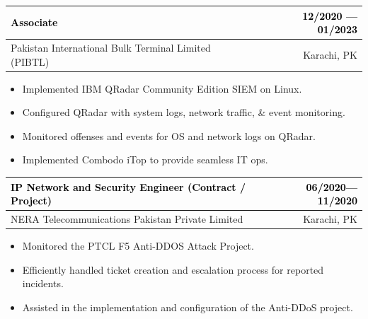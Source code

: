 \documentclass{resume}
\begin{document}
\begin{tabularx}{\linewidth}{|X|r|}
    \hline
    
    \cellcolor{lightblue}\textcolor{black}{Associate} & 
    \cellcolor{lightblue}\textcolor{black}{12/2020 --- 01/2023} \\
    \hline
    
    Pakistan International Bulk Terminal Limited (PIBTL) & Karachi, PK \\
    \hline
\end{tabularx}
\begin{itemize}
\item {} Implemented IBM QRadar Community Edition SIEM on Linux.
\item {} Configured QRadar with system logs, network traffic, \& event monitoring.
\item {} Monitored offenses and events for OS and network logs on QRadar.
\item {} Implemented Combodo iTop to provide seamless IT ops.
\end{itemize}
 \vspace{-0.2cm} 
\divider

  
\begin{tabularx}{\linewidth}{|X|r|}
    \hline
    
    \cellcolor{lightblue}\textcolor{black}{IP Network and Security Engineer (Contract / Project)} & 
    \cellcolor{lightblue}\textcolor{black}{06/2020--- 11/2020} \\
    \hline
    
    NERA Telecommunications Pakistan Private Limited & Karachi, PK \\
    \hline
\end{tabularx}
\begin{itemize}
\item {} Monitored the PTCL F5 Anti-DDOS Attack Project.
\item {} Efficiently handled ticket creation and escalation process for reported incidents.
\item {} Assisted in the implementation and configuration of the Anti-DDoS project.
\end{itemize}
 \vspace{-0.2cm} 
\divider
\end{document}
